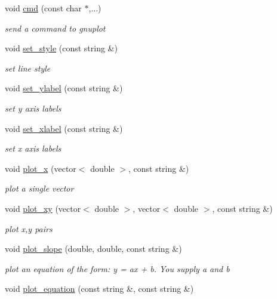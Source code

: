 \begin{DoxyCompactItemize}
void \mbox{\hyperlink{class_gnuplot_a6f299285af0a0ee2cf1722c469aa1a57}{cmd}} (const char $\ast$,...)
\begin{DoxyCompactList}\small\item\em send a command to gnuplot \end{DoxyCompactList}\item 
void \mbox{\hyperlink{class_gnuplot_accdd7b69237ead4109c74e1e440c185f}{set\+\_\+style}} (const string \&)
\begin{DoxyCompactList}\small\item\em set line style \end{DoxyCompactList}\item 
void \mbox{\hyperlink{class_gnuplot_af85dd1d368699914112460285ead0fde}{set\+\_\+ylabel}} (const string \&)
\begin{DoxyCompactList}\small\item\em set y axis labels \end{DoxyCompactList}\item 
void \mbox{\hyperlink{class_gnuplot_ac9b0c04d47e375eb82f50437eda5e46e}{set\+\_\+xlabel}} (const string \&)
\begin{DoxyCompactList}\small\item\em set x axis labels \end{DoxyCompactList}\item 
void \mbox{\hyperlink{class_gnuplot_ae3b7c28efb53f636431b9655085906be}{plot\+\_\+x}} (vector$<$ double $>$, const string \&)
\begin{DoxyCompactList}\small\item\em plot a single vector \end{DoxyCompactList}\item 
void \mbox{\hyperlink{class_gnuplot_a1e817a58ef3e40ceaeb128c7e6437e8a}{plot\+\_\+xy}} (vector$<$ double $>$, vector$<$ double $>$, const string \&)
\begin{DoxyCompactList}\small\item\em plot x,y pairs \end{DoxyCompactList}\item 
void \mbox{\hyperlink{class_gnuplot_a80c9d9e6bc3e64db073d9d39d6ec5d5f}{plot\+\_\+slope}} (double, double, const string \&)
\begin{DoxyCompactList}\small\item\em plot an equation of the form\+: y = ax + b. You supply a and b \end{DoxyCompactList}\item 
void \mbox{\hyperlink{class_gnuplot_a55e6430f1329bf8a66f155dcacb9d112}{plot\+\_\+equation}} (const string \&, const string \&)

\end{DoxyCompactItemize}
